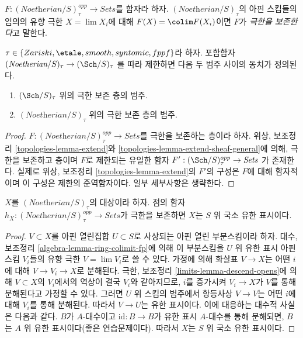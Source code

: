 \noindent
$F : (\textit{Noetherian}/S)_\tau^{opp} \to \textit{Sets}$를 함자라 하자.
$(\textit{Noetherian}/S)_\tau$의 아핀 스킴들의 임의의 유향 극한
$X = \lim X_i$에 대해 $F(X) = \colim F(X_i)$이면
$F$가 {\it 극한을 보존한다}고 말한다.

\begin{lemma}
\label{lemma-canonical-extension}
$\tau \in \{Zariski, \etale, smooth, syntomic, fppf\}$라 하자.
포함함자
$(\textit{Noetherian}/S)_\tau \to (\Sch/S)_\tau$
를 따라 제한하면 다음 두 범주 사이의 동치가 정의된다.
\begin{enumerate}
\item $(\Sch/S)_\tau$ 위의 극한 보존 층의 범주.
\item $(\textit{Noetherian}/S)_\tau$ 위의 극한 보존 층의 범주.
\end{enumerate}
\end{lemma}

\begin{proof}
$F : (\textit{Noetherian}/S)_\tau^{opp} \to \textit{Sets}$를
극한을 보존하는 층이라 하자. 위상, 보조정리
\ref{topologies-lemma-extend}와 \ref{topologies-lemma-extend-sheaf-general}에 의해,
극한을 보존하고 층이며 $F$로 제한되는 유일한 함자
$F' : (\Sch/S)_\tau^{opp} \to \textit{Sets}$
가 존재한다. 실제로 위상, 보조정리 \ref{topologies-lemma-extend}의
$F'$의 구성은 $F$에 대해 함자적이며 이 구성은 제한의 준역함자이다.
일부 세부사항은 생략한다.
\end{proof}

\begin{lemma}
\label{lemma-representable-limit-preserving}
$X$를 $(\textit{Noetherian}/S)_\tau$의 대상이라 하자.
점의 함자 $h_X : (\textit{Noetherian}/S)_\tau^{opp} \to \textit{Sets}$가
극한을 보존하면 $X$는 $S$ 위 국소 유한 표시이다.
\end{lemma}

\begin{proof}
$V \subset X$를 아핀 열린집합 $U \subset S$로 사상되는 아핀 열린
부분스킴이라 하자. 대수, 보조정리 \ref{algebra-lemma-ring-colimit-fp}에 의해
이 부분스킴을 $U$ 위 유한 표시 아핀 스킴 $V_i$들의 유향 극한
$V = \lim V_i$로 쓸 수 있다. 가정에 의해 화살표 $V \to X$는 어떤 $i$에 대해
$V \to V_i \to X$로 분해된다. 극한, 보조정리
\ref{limits-lemma-descend-opens}에 의해 $V \subset X$의 $V_i$에서의
역상이 결국 $V_i$와 같아지므로, $i$를 증가시켜 $V_i \to X$가
$V$를 통해 분해된다고 가정할 수 있다.
그러면 $U$ 위 스킴의 범주에서 항등사상 $V \to V$는 어떤 $i$에 대해
$V_i$를 통해 분해된다. 따라서 $V \to U$는 유한 표시이다.
이에 대응하는 대수적 사실은 다음과 같다. $B$가 $A$-대수이고
$\text{id} : B \to B$가 유한 표시 $A$-대수를 통해 분해되면,
$B$는 $A$ 위 유한 표시이다(좋은 연습문제이다).
따라서 $X$는 $S$ 위 국소 유한 표시이다.
\end{proof}

